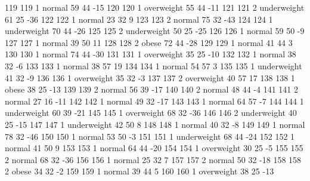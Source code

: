 \begin{Schunk}
\begin{Soutput}
		119         119   1      normal  59         44          -15
		120         120   1  overweight  55         44          -11
		121         121   2 underweight  61         25          -36
		122         122   1      normal  23         32            9
		123         123   2      normal  75         32          -43
		124         124   1 underweight  70         44          -26
		125         125   2 underweight  50         25          -25
		126         126   1      normal  59         50           -9
		127         127   1      normal  39         50           11
		128         128   2       obese  72         44          -28
		129         129   1      normal  41         44            3
		130         130   1      normal  74         44          -30
		131         131   1  overweight  35         25          -10
		132         132   1      normal  38         32           -6
		133         133   1      normal  38         57           19
		134         134   1      normal  54         57            3
		135         135   1 underweight  41         32           -9
		136         136   1  overweight  35         32           -3
		137         137   2  overweight  40         57           17
		138         138   1       obese  38         25          -13
		139         139   2      normal  56         39          -17
		140         140   2      normal  48         44           -4
		141         141   2      normal  27         16          -11
		142         142   1      normal  49         32          -17
		143         143   1      normal  64         57           -7
		144         144   1 underweight  60         39          -21
		145         145   1  overweight  68         32          -36
		146         146   2 underweight  40         25          -15
		147         147   1 underweight  42         50            8
		148         148   1      normal  40         32           -8
		149         149   1      normal  78         32          -46
		150         150   1      normal  53         50           -3
		151         151   1 underweight  68         44          -24
		152         152   1      normal  41         50            9
		153         153   1      normal  64         44          -20
		154         154   1  overweight  30         25           -5
		155         155   2      normal  68         32          -36
		156         156   1      normal  25         32            7
		157         157   2      normal  50         32          -18
		158         158   2       obese  34         32           -2
		159         159   1      normal  39         44            5
		160         160   1  overweight  38         25          -13

\end{Soutput}
\end{Schunk}
